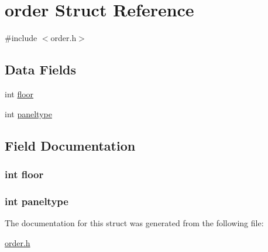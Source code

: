\hypertarget{structorder}{\section{order Struct Reference}
\label{structorder}
}


{\ttfamily \#include $<$order.\-h$>$}

\subsection*{Data Fields}
\begin{DoxyCompactItemize}
\item 
int \hyperlink{structorder_aae85c3a510bb6ec64e3569ede2518893}{floor}
\item 
int \hyperlink{structorder_a90cf35d99f0cec45cace19d0d2534a09}{paneltype}
\end{DoxyCompactItemize}


\subsection{Field Documentation}
\hypertarget{structorder_aae85c3a510bb6ec64e3569ede2518893}{
\subsubsection[{floor}]{\setlength{\rightskip}{0pt plus 5cm}int floor}}\label{structorder_aae85c3a510bb6ec64e3569ede2518893}
\hypertarget{structorder_a90cf35d99f0cec45cace19d0d2534a09}{
\subsubsection[{paneltype}]{\setlength{\rightskip}{0pt plus 5cm}int paneltype}}\label{structorder_a90cf35d99f0cec45cace19d0d2534a09}


The documentation for this struct was generated from the following file\-:\begin{DoxyCompactItemize}
\item 
\hyperlink{order_8h}{order.\-h}\end{DoxyCompactItemize}
